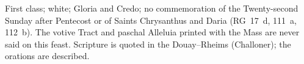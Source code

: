 \vspace{0.1em}
{\footnotesize\noindent First class; white; Gloria and Credo; no
commemoration of the Twenty-second Sunday after Pentecost or of Saints
Chrysanthus and Daria (RG~17~d, 111~a, 112~b). The votive Tract and paschal
Alleluia printed with the Mass are never said on this feast. Scripture is
quoted in the Douay--Rheims (Challoner); the orations are described.\par}
